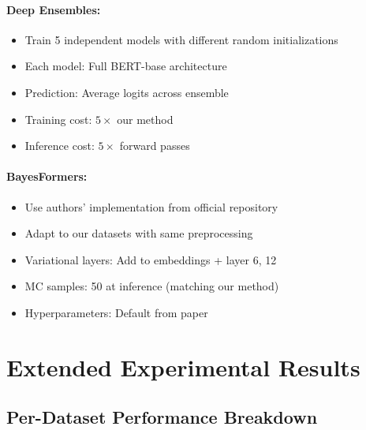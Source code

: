 \documentclass[12pt,a4paper]{article}
\theoremstyle{definition}
\begin{document}
\paragraph{Deep Ensembles:}
\begin{itemize}
\item Train 5 independent models with different random initializations
\item Each model: Full BERT-base architecture
\item Prediction: Average logits across ensemble
\item Training cost: $5\times$ our method
\item Inference cost: $5\times$ forward passes
\end{itemize}

\paragraph{BayesFormers:}
\begin{itemize}
\item Use authors' implementation from official repository
\item Adapt to our datasets with same preprocessing
\item Variational layers: Add to embeddings + layer 6, 12
\item MC samples: 50 at inference (matching our method)
\item Hyperparameters: Default from paper
\end{itemize}

\section{Extended Experimental Results}
\label{app:extended_results}

\subsection{Per-Dataset Performance Breakdown}
\end{document}
